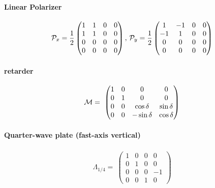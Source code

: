 \paragraph{Linear Polarizer}
\begin{align}
\mathcal{P}_x=\frac{1}{2}
\begin{pmatrix}
    1 & 1 & 0 & 0 \\
    1 & 1 & 0 & 0 \\
    0 & 0 & 0 & 0 \\
    0 & 0 & 0 & 0
  \end{pmatrix}
, \,
\mathcal{P}_y=\frac{1}{2}
\begin{pmatrix}
     1 & -1 & 0 & 0 \\
    -1 &  1 & 0 & 0 \\
     0 &  0 & 0 & 0 \\
     0 &  0 & 0 & 0
\end{pmatrix}
\end{align}
% 
\paragraph{retarder}
\begin{align}
\mathcal{M}=\
\begin{pmatrix}
    1 & 0 & 0 &  0 \\
    0 & 1 & 0 &  0 \\
    0 & 0 & \cos \delta & \sin \delta \\
    0 & 0 & -\sin \delta &  \cos \delta
\end{pmatrix}
\end{align}
% 
\paragraph{Quarter-wave plate (fast-axis vertical)}
\begin{align}
\Lambda_{1/4}=\
\begin{pmatrix}
    1 & 0 & 0 &  0 \\
    0 & 1 & 0 &  0 \\
    0 & 0 & 0 & -1 \\
    0 & 0 & 1 &  0
\end{pmatrix}
\end{align}
% 
